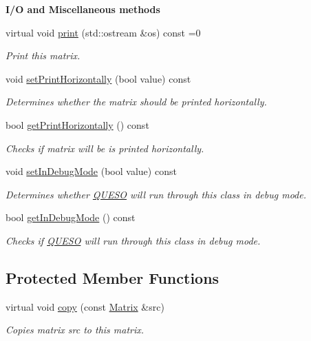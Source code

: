 \begin{Indent}{\bf I/\-O and Miscellaneous methods}\par
\begin{DoxyCompactItemize}
\item 
virtual void \hyperlink{class_q_u_e_s_o_1_1_matrix_ae2a1ec7b27cc8ae0ffb7a5c91bfec8fc}{print} (std\-::ostream \&os) const =0
\begin{DoxyCompactList}\small\item\em Print this matrix. \end{DoxyCompactList}\item 
void \hyperlink{class_q_u_e_s_o_1_1_matrix_a1f48b60a98b211770f92d42441f51c35}{set\-Print\-Horizontally} (bool value) const 
\begin{DoxyCompactList}\small\item\em Determines whether the matrix should be printed horizontally. \end{DoxyCompactList}\item 
bool \hyperlink{class_q_u_e_s_o_1_1_matrix_a4b6bdbf50356e19e845d6134ce435ef0}{get\-Print\-Horizontally} () const 
\begin{DoxyCompactList}\small\item\em Checks if matrix will be is printed horizontally. \end{DoxyCompactList}\item 
void \hyperlink{class_q_u_e_s_o_1_1_matrix_a0fa94aaee496541e72d527b98af57bae}{set\-In\-Debug\-Mode} (bool value) const 
\begin{DoxyCompactList}\small\item\em Determines whether \hyperlink{namespace_q_u_e_s_o}{Q\-U\-E\-S\-O} will run through this class in debug mode. \end{DoxyCompactList}\item 
bool \hyperlink{class_q_u_e_s_o_1_1_matrix_ad714793ba87347d88f19b79231405182}{get\-In\-Debug\-Mode} () const 
\begin{DoxyCompactList}\small\item\em Checks if \hyperlink{namespace_q_u_e_s_o}{Q\-U\-E\-S\-O} will run through this class in debug mode. \end{DoxyCompactList}\end{DoxyCompactItemize}
\end{Indent}
\subsection*{Protected Member Functions}
\begin{DoxyCompactItemize}
\item 
virtual void \hyperlink{class_q_u_e_s_o_1_1_matrix_ad2be7e0868ead79c99d18b8f23360bcb}{copy} (const \hyperlink{class_q_u_e_s_o_1_1_matrix}{Matrix} \&src)
\begin{DoxyCompactList}\small\item\em Copies matrix {\ttfamily src} to {\ttfamily this} matrix. \end{DoxyCompactList}\end{DoxyCompactItemize}
